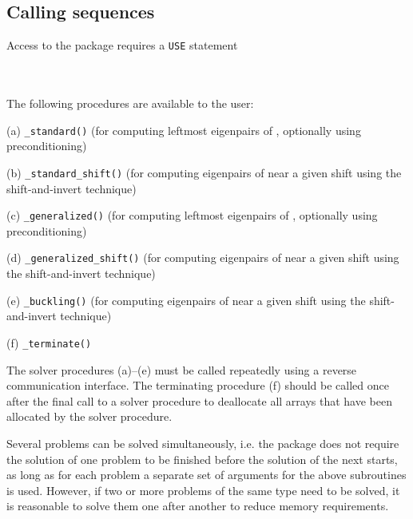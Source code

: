 \documentclass{spral}
\begin{document}
\subsection{Calling sequences}

\label{sec:call}

Access to the package requires a {\tt USE} statement \\ \\
\indent\hspace{8mm}{\tt use \fullpackagename} \\

\medskip

\noindent The following procedures are available to the user:
%
\begin{description}
\vspace{-0.1cm}
\item (a) {\tt \solver\_standard()} 
(for computing leftmost eigenpairs of , 
optionally using preconditioning)
\item (b) {\tt \solver\_standard\_shift()} 
(for computing eigenpairs of  near a given shift %
using the shift-and-invert technique)
\item (c) {\tt \solver\_generalized()} 
(for computing leftmost eigenpairs of 
, optionally using preconditioning)
\item (d) {\tt \solver\_generalized\_shift()} 
(for computing eigenpairs of 
 near a given shift %
using the shift-and-invert technique)
\item (e) {\tt \solver\_buckling()} 
(for computing eigenpairs of 
 near a given shift %
using the shift-and-invert technique)
\item (f) {\tt \solver\_terminate()} 
%
\end{description}

The solver procedures (a)--(e)
must be called repeatedly using
a reverse communication interface.
The terminating procedure (f)
should be called once after the
final call to 
a solver procedure
to deallocate all arrays 
that have been allocated by %
the solver procedure.

Several problems can be solved simultaneously,
i.e. the package does not require the solution of
one problem to be finished before the solution of
the next starts, as long as for each problem a separate set
of arguments for the above subroutines is used.
However, if two or more problems of the same type
need to be solved, it is reasonable to solve them one
after another  to reduce  memory requirements.
\fi
\end{document}
